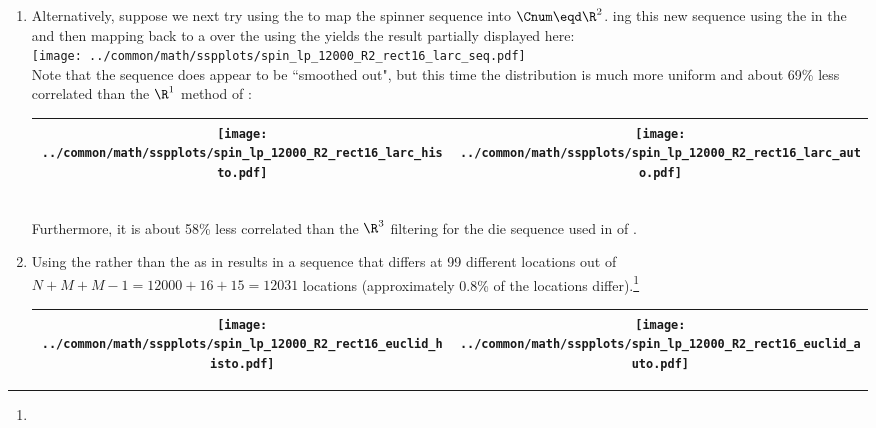 \begin{example}
\begin{enumerate}
  \item \label{item:spin_lp_R2_rect16_larc}
        Alternatively, suppose we next try
        using the  
        to map the spinner sequence into $\Cnum\eqd\R^2$.
        ing this new sequence using the 
        in the  
        and then mapping back to a  over the  
        using the  yields the result partially displayed here:
        \\\texttt{[image: ../common/math/sspplots/spin\_lp\_12000\_R2\_rect16\_larc\_seq.pdf]}\\
        Note that the sequence does appear to be ``smoothed out", 
        but this time the distribution is much more uniform and about 
        69\% less correlated than the $\R^1$ method of :
        \\\begin{tabular}{|>{\scs}c|>{\scs}c|}
             \hline
             \texttt{[image: ../common/math/sspplots/spin\_lp\_12000\_R2\_rect16\_larc\_histo.pdf]}%
            &\texttt{[image: ../common/math/sspplots/spin\_lp\_12000\_R2\_rect16\_larc\_auto.pdf]}
           \\\hline
        \end{tabular}\\
        Furthermore, it is about 58\% less correlated than the $\R^3$ filtering for the die sequence
        used in  of .

  \item Using the  rather than the  as in 
        results in a sequence that differs at 99 different locations out of $N+M+M-1=12000+16+15=12031$ locations
        (approximately 0.8\% of the locations differ).\footnote{} %
        \\\begin{tabular}{|>{\scs}c|>{\scs}c|}
             \hline
             \texttt{[image: ../common/math/sspplots/spin\_lp\_12000\_R2\_rect16\_euclid\_histo.pdf]}%
            &\texttt{[image: ../common/math/sspplots/spin\_lp\_12000\_R2\_rect16\_euclid\_auto.pdf]}
           \\\hline
        \end{tabular}


\end{enumerate}
\end{example}

